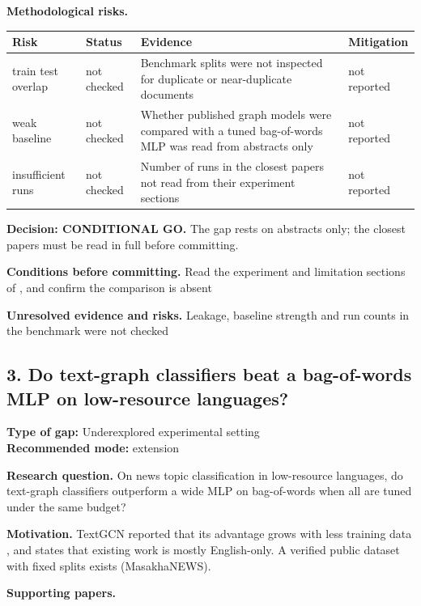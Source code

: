 \documentclass[11pt,a4paper]{article}
\begin{document}
\textbf{Methodological risks.}

{\small
\begin{longtable}{>{\raggedright\arraybackslash}p{}>{\raggedright\arraybackslash}p{}>{\raggedright\arraybackslash}p{}>{\raggedright\arraybackslash}p{}}
\toprule
\textbf{Risk} & \textbf{Status} & \textbf{Evidence} & \textbf{Mitigation} \\
\midrule
\endhead
train test overlap & not checked & Benchmark splits were not inspected for duplicate or near-duplicate documents & not reported \\
weak baseline & not checked & Whether published graph models were compared with a tuned bag-of-words MLP was read from abstracts only & not reported \\
insufficient runs & not checked & Number of runs in the closest papers not read from their experiment sections & not reported \\
\bottomrule
\end{longtable}
}

\textbf{Decision: CONDITIONAL GO.} The gap rests on abstracts only; the closest papers must be read in full before committing.

\textbf{Conditions before committing.} Read the experiment and limitation sections of \cite{shchur2019}, \cite{galke2022} and confirm the comparison is absent

\textbf{Unresolved evidence and risks.} Leakage, baseline strength and run counts in the benchmark were not checked

\subsection{3. Do text-graph classifiers beat a bag-of-words MLP on low-resource languages?}
\textbf{Type of gap:} Underexplored experimental setting\\
\textbf{Recommended mode:} extension

\textbf{Research question.} On news topic classification in low-resource languages, do text-graph classifiers outperform a wide MLP on bag-of-words when all are tuned under the same budget?

\textbf{Motivation.} TextGCN reported that its advantage grows with less training data \cite{yao2019}, and \cite{ghosh2022} states that existing work is mostly English-only. A verified public dataset with fixed splits exists (MasakhaNEWS).

\textbf{Supporting papers.} \cite{yao2019,ghosh2022,galke2022}
\end{document}
